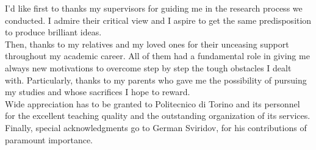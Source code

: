 \ringraziamenti
I'd like first to thanks my supervisors for guiding me in the research process we conducted. I admire their critical view and I aspire to get the same predisposition to produce brilliant ideas.\\
Then, thanks to my relatives and my loved ones for their unceasing support throughout my academic career. All of them had a fundamental role in giving me always new motivations to overcome step by step the tough obstacles I dealt with. Particularly, thanks to my parents who gave me the possibility of pursuing my studies and whose sacrifices I hope to reward.\\
Wide appreciation has to be granted to Politecnico di Torino and its personnel for the excellent teaching quality and the outstanding organization of its services. \\ 
Finally, special acknowledgments go to German Sviridov, for his contributions of paramount importance. 